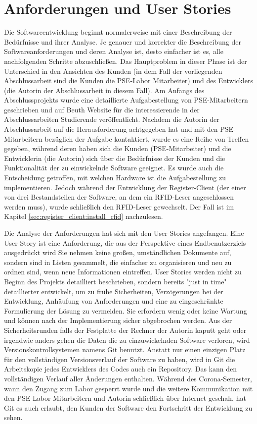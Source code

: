 \section{Anforderungen und User Stories}
\label{sec:design:user_stories}
Die Softwareentwicklung beginnt normalerweise mit einer Beschreibung der Bedürfnisse und ihrer Analyse. Je genauer und korrekter die Beschreibung der Softwareanforderungen und deren Analyse ist, desto einfacher ist es, alle nachfolgenden Schritte abzuschließen. Das Hauptproblem in dieser Phase ist der Unterschied in den Ansichten des Kunden (in dem Fall der vorliegenden Abschlussarbeit sind die Kunden die PSE-Labor Mitarbeiter) und des Entwicklers (die Autorin der Abschlussarbeit in diesem Fall). Am Anfangs des Abschlussprojekts wurde eine detaillierte Aufgabestellung von PSE-Mitarbeitern geschrieben und auf Beuth Website für die interessierende in der Abschlussarbeiten Studierende veröffentlicht\cite{website:17}. Nachdem die Autorin der Abschlussarbeit auf die Herausforderung achtgegeben hat und mit den PSE-Mitarbeitern bezüglich der Aufgabe kontaktiert, wurde es eine Reihe von Treffen gegeben, während deren haben sich die Kunden (PSE-Mitarbeiter) und die Entwicklerin (die Autorin) sich über die Bedürfnisse der Kunden und die Funktionalität der zu einwickelnde Software geeignet. Es wurde auch die Entscheidung getroffen, mit welchen Hardware ist die Aufgabestellung zu implementieren. Jedoch während der Entwicklung der Register-Client (der einer von drei Bestandsteilen der Software, an dem ein RFID-Leser angeschlossen werden muss), wurde schließlich den RFID-Leser gewechselt. Der Fall ist im Kapitel \ref{sec:register_client:install_rfid} nachzulesen.

Die Analyse der Anforderungen hat sich mit den User Stories angefangen. Eine User Story ist eine Anforderung, die aus der Perspektive eines Endbenutzerziels ausgedrückt wird Sie nehmen keine großen, umständlichen Dokumente auf, sondern sind in Listen gesammelt, die einfacher zu organisieren und neu zu ordnen sind, wenn neue Informationen eintreffen. User Stories werden nicht zu Beginn des Projekts detailliert beschrieben, sondern bereits "just in time" detaillierter entwickelt, um zu frühe Sicherheiten, Verzögerungen bei der Entwicklung, Anhäufung von Anforderungen und eine zu eingeschränkte Formulierung der Lösung zu vermeiden. Sie erfordern wenig oder keine Wartung und können nach der Implementierung sicher abgebrochen werden. Aus der Sicherheitsrunden falls der Festplatte der Rechner der Autorin kaputt geht oder irgendwie anders gehen die Daten die zu einzuwickelnden Software verloren, wird Versionskontrollsystemen namens Git benutzt. Anstatt nur einen einzigen Platz für den vollständigen Versionsverlauf der Software zu haben, wird in Git die Arbeitskopie jedes Entwicklers des Codes auch ein Repository. Das kann den vollständigen Verlauf aller Änderungen enthalten. Während des Corona-Semester, wann den Zugang zum Labor gesperrt wurde und die weitere Kommunikation mit den PSE-Labor Mitarbeitern und Autorin schließlich über Internet geschah, hat Git es auch erlaubt, den Kunden der Software den Fortschritt der Entwicklung zu sehen. 

